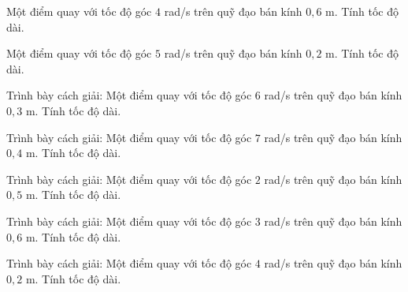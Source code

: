 \begin{ex}
Một điểm quay với tốc độ góc $4$ rad/s trên quỹ đạo bán kính $0,6$ m. Tính tốc độ dài.
\end{ex}

\begin{ex}
Một điểm quay với tốc độ góc $5$ rad/s trên quỹ đạo bán kính $0,2$ m. Tính tốc độ dài.
\end{ex}

\begin{bt}
Trình bày cách giải: Một điểm quay với tốc độ góc $6$ rad/s trên quỹ đạo bán kính $0,3$ m. Tính tốc độ dài.
\end{bt}

\begin{bt}
Trình bày cách giải: Một điểm quay với tốc độ góc $7$ rad/s trên quỹ đạo bán kính $0,4$ m. Tính tốc độ dài.
\end{bt}

\begin{bt}
Trình bày cách giải: Một điểm quay với tốc độ góc $2$ rad/s trên quỹ đạo bán kính $0,5$ m. Tính tốc độ dài.
\end{bt}

\begin{bt}
Trình bày cách giải: Một điểm quay với tốc độ góc $3$ rad/s trên quỹ đạo bán kính $0,6$ m. Tính tốc độ dài.
\end{bt}

\begin{bt}
Trình bày cách giải: Một điểm quay với tốc độ góc $4$ rad/s trên quỹ đạo bán kính $0,2$ m. Tính tốc độ dài.
\end{bt}

